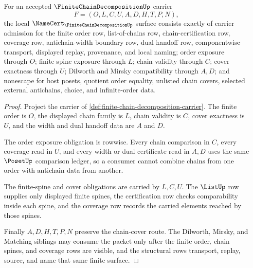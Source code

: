 \begin{theorem}
\label{thm:finite-chain-decomposition-namecert-obligations}
For an accepted $\FiniteChainDecompositionUp$ carrier
$$
F=(O,L,C,U,A,D,H,T,P,N),
$$
the local $\NameCert_{\FiniteChainDecompositionUp}$ surface consists exactly of carrier admission for the finite order row, list-of-chains row, chain-certification row, coverage row, antichain-width boundary row, dual handoff row, componentwise transport, displayed replay, provenance, and local naming; order exposure through $O$; finite spine exposure through $L$; chain validity through $C$; cover exactness through $U$; Dilworth and Mirsky compatibility through $A,D$; and nonescape for host posets, quotient order equality, unlisted chain covers, selected external antichains, choice, and infinite-order data.
\end{theorem}
\begin{proof}
Project the carrier of \autoref{def:finite-chain-decomposition-carrier}. The finite order is $O$, the displayed chain family is $L$, chain validity is $C$, cover exactness is $U$, and the width and dual handoff data are $A$ and $D$.

The order exposure obligation is rowwise. Every chain comparison in $C$, every coverage read in $U$, and every width or dual-certificate read in $A,D$ uses the same $\PosetUp$ comparison ledger, so a consumer cannot combine chains from one order with antichain data from another.

The finite-spine and cover obligations are carried by $L,C,U$. The $\ListUp$ row supplies only displayed finite spines, the certification row checks comparability inside each spine, and the coverage row records the carried elements reached by those spines.

Finally $A,D,H,T,P,N$ preserve the chain-cover route. The Dilworth, Mirsky, and Matching siblings may consume the packet only after the finite order, chain spines, and coverage rows are visible, and the structural rows transport, replay, source, and name that same finite surface.
\end{proof}

